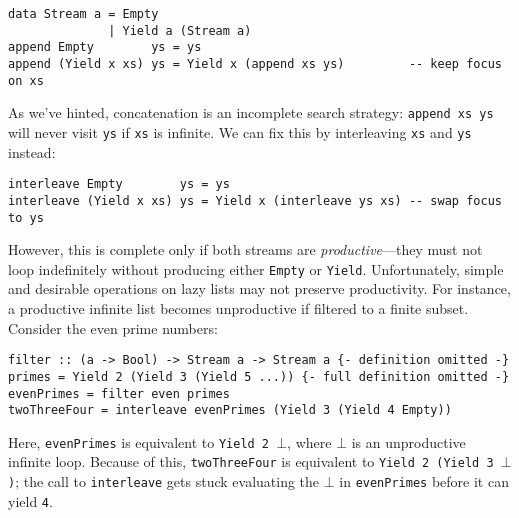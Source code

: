 \documentclass[acmsmall,screen,dvipsnames,svgnames]{acmart}
\newcommand\hask[1]{\texttt{#1}}
\newcommand\ttt\texttt
\begin{document}
\begin{verbatim}
data Stream a = Empty
              | Yield a (Stream a)
append Empty        ys = ys
append (Yield x xs) ys = Yield x (append xs ys)         -- keep focus on xs
\end{verbatim}

\noindent
As we've hinted, concatenation is an incomplete search strategy: \ttt{append xs ys} will never visit \ttt{ys} if \ttt{xs} is infinite.
We can fix this by interleaving \ttt{xs} and \ttt{ys} instead:

\begin{verbatim}
interleave Empty        ys = ys
interleave (Yield x xs) ys = Yield x (interleave ys xs) -- swap focus to ys
\end{verbatim}

\noindent
However, this is complete only if both streams are \emph{productive}---they must not loop indefinitely without producing either \hask{Empty} or \hask{Yield}.
%
%
%
%
Unfortunately, simple and desirable operations on lazy lists may not preserve productivity.
For instance, a productive infinite list becomes unproductive if filtered to a finite subset.
Consider the even prime numbers:


\begin{verbatim}
filter :: (a -> Bool) -> Stream a -> Stream a {- definition omitted -}
primes = Yield 2 (Yield 3 (Yield 5 ...)) {- full definition omitted -}
evenPrimes = filter even primes
twoThreeFour = interleave evenPrimes (Yield 3 (Yield 4 Empty))
\end{verbatim}

\noindent
Here, \ttt{evenPrimes} is equivalent to \mbox{\hask{Yield 2 }$\bot$}, where $\bot$ is an unproductive infinite loop. %
Because of this, \ttt{twoThreeFour} is equivalent to \mbox{\hask{Yield 2 (Yield 3 }$\bot$\ttt{)}}; the call to \ttt{interleave} gets stuck evaluating the $\bot$ in \ttt{evenPrimes} before it can yield \hask{4}.\footnotemark
\end{document}
